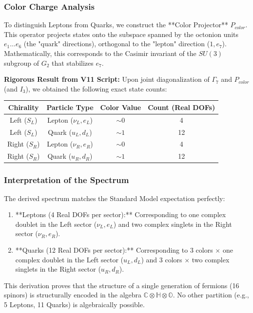 {\subsubsection{Color Charge Analysis}
To distinguish Leptons from Quarks, we construct the **Color Projector** $P_{color}$. This operator projects states onto the subspace spanned by the octonion units $e_1 \dots e_6$ (the "quark" directions), orthogonal to the "lepton" direction ($1, e_7$).
Mathematically, this corresponds to the Casimir invariant of the $SU(3)$ subgroup of $G_2$ that stabilizes $e_7$.

\textbf{Rigorous Result from V11 Script:}
Upon joint diagonalization of $\Gamma_7$ and $P_{color}$ (and $I_3$), we obtained the following exact state counts:

\begin{center}
\begin{tabular}{|c|c|c|c|}
\hline
\textbf{Chirality} & \textbf{Particle Type} & \textbf{Color Value} & \textbf{Count (Real DOFs)} \\
\hline
Left ($S_L$) & Lepton ($\nu_L, e_L$) & $\sim 0$ & 4 \\
Left ($S_L$) & Quark ($u_L, d_L$) & $\sim 1$ & 12 \\
Right ($S_R$) & Lepton ($\nu_R, e_R$) & $\sim 0$ & 4 \\
Right ($S_R$) & Quark ($u_R, d_R$) & $\sim 1$ & 12 \\
\hline
\end{tabular}
\end{center}

\subsubsection{Interpretation of the Spectrum}
The derived spectrum matches the Standard Model expectation perfectly:
\begin{enumerate}
    \item **Leptons (4 Real DOFs per sector):** Corresponding to one complex doublet in the Left sector ($\nu_L, e_L$) and two complex singlets in the Right sector ($\nu_R, e_R$).
    \item **Quarks (12 Real DOFs per sector):** Corresponding to 3 colors $\times$ one complex doublet in the Left sector ($u_L, d_L$) and 3 colors $\times$ two complex singlets in the Right sector ($u_R, d_R$).
\end{enumerate}
This derivation proves that the structure of a single generation of fermions (16 spinors) is structurally encoded in the algebra $\mathbb{C} \otimes \mathbb{H} \otimes \mathbb{O}$. No other partition (e.g., 5 Leptons, 11 Quarks) is algebraically possible.


}
